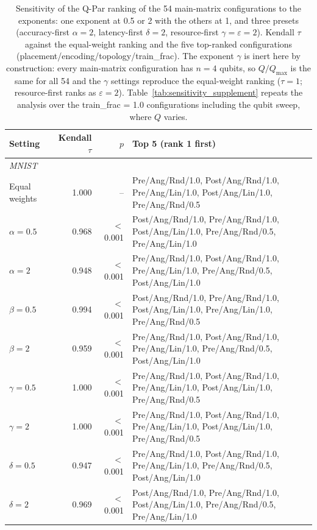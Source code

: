 \begin{table}[!t]
\centering
\caption{Sensitivity of the Q-Par ranking of the 54 main-matrix configurations to the exponents: one exponent at 0.5 or 2 with the others at 1, and three presets (accuracy-first $\alpha = 2$, latency-first $\delta = 2$, resource-first $\gamma = \varepsilon = 2$). Kendall $\tau$ against the equal-weight ranking and the five top-ranked configurations (placement/encoding/topology/train\_frac). The exponent $\gamma$ is inert here by construction: every main-matrix configuration has $n = 4$ qubits, so $Q/Q_{\max}$ is the same for all 54 and the $\gamma$ settings reproduce the equal-weight ranking ($\tau = 1$; resource-first ranks as $\varepsilon = 2$). Table~\ref{tab:sensitivity_supplement} repeats the analysis over the train\_frac = 1.0 configurations including the qubit sweep, where $Q$ varies.}
\label{tab:sensitivity}
\scriptsize
\begin{tabular}{lrrl}
\toprule
Setting & Kendall $\tau$ & $p$ & Top 5 (rank 1 first) \\
\midrule
\multicolumn{4}{l}{\textit{MNIST}} \\
Equal weights & 1.000 & -- & Pre/Ang/Rnd/1.0, Post/Ang/Rnd/1.0, Pre/Ang/Lin/1.0, Post/Ang/Lin/1.0, Pre/Ang/Rnd/0.5 \\
$\alpha = 0.5$ & 0.968 & $<$0.001 & Post/Ang/Rnd/1.0, Pre/Ang/Rnd/1.0, Post/Ang/Lin/1.0, Pre/Ang/Rnd/0.5, Pre/Ang/Lin/1.0 \\
$\alpha = 2$ & 0.948 & $<$0.001 & Pre/Ang/Rnd/1.0, Post/Ang/Rnd/1.0, Pre/Ang/Lin/1.0, Pre/Ang/Rnd/0.5, Post/Ang/Lin/1.0 \\
$\beta = 0.5$ & 0.994 & $<$0.001 & Post/Ang/Rnd/1.0, Pre/Ang/Rnd/1.0, Post/Ang/Lin/1.0, Pre/Ang/Lin/1.0, Pre/Ang/Rnd/0.5 \\
$\beta = 2$ & 0.959 & $<$0.001 & Pre/Ang/Rnd/1.0, Post/Ang/Rnd/1.0, Pre/Ang/Lin/1.0, Pre/Ang/Rnd/0.5, Post/Ang/Lin/1.0 \\
$\gamma = 0.5$ & 1.000 & $<$0.001 & Pre/Ang/Rnd/1.0, Post/Ang/Rnd/1.0, Pre/Ang/Lin/1.0, Post/Ang/Lin/1.0, Pre/Ang/Rnd/0.5 \\
$\gamma = 2$ & 1.000 & $<$0.001 & Pre/Ang/Rnd/1.0, Post/Ang/Rnd/1.0, Pre/Ang/Lin/1.0, Post/Ang/Lin/1.0, Pre/Ang/Rnd/0.5 \\
$\delta = 0.5$ & 0.947 & $<$0.001 & Pre/Ang/Rnd/1.0, Post/Ang/Rnd/1.0, Pre/Ang/Lin/1.0, Pre/Ang/Rnd/0.5, Post/Ang/Lin/1.0 \\
$\delta = 2$ & 0.969 & $<$0.001 & Post/Ang/Rnd/1.0, Pre/Ang/Rnd/1.0, Post/Ang/Lin/1.0, Pre/Ang/Rnd/0.5, Pre/Ang/Lin/1.0 \\

\end{tabular}
\end{table}
